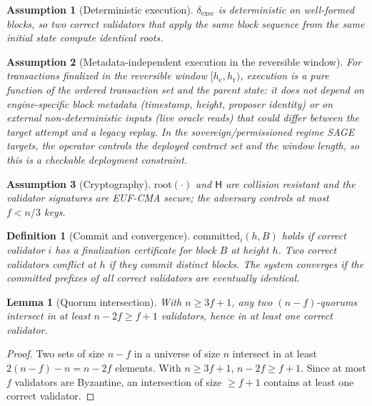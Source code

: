 \documentclass[journal]{IEEEtran}
\newtheorem{lemma}{Lemma}
\newtheorem{definition}{Definition}
\newtheorem{assumption}{Assumption}
\theoremstyle{remark}
\begin{document}
\begin{assumption}[Deterministic execution]
\label{as:exec}
$\delta_{\mathrm{exec}}$ is deterministic on well-formed blocks, so two correct validators
that apply the same block sequence from the same initial state compute identical roots.
\end{assumption}

\begin{assumption}[Metadata-independent execution in the reversible window]
\label{as:metadata}
For transactions finalized in the reversible window $[h_{\mathrm{c}}, h_{\mathrm{r}})$, execution
is a pure function of the ordered transaction set and the parent state: it does not depend on
engine-specific block metadata (timestamp, height, proposer identity) or on external
non-deterministic inputs (live oracle reads) that could differ between the target attempt and a
legacy replay. In the sovereign/permissioned regime SAGE targets, the operator controls the
deployed contract set and the window length, so this is a checkable deployment constraint.
\end{assumption}

\begin{assumption}[Cryptography]
\label{as:crypto}
$\mathrm{root}(\cdot)$ and $\mathsf{H}$ are collision resistant and the validator signatures are
EUF-CMA secure; the adversary controls at most $f<n/3$ keys.
\end{assumption}

\begin{definition}[Commit and convergence]
\label{def:commit}
$\mathrm{committed}_i(h,B)$ holds if correct validator $i$ has a finalization certificate for
block $B$ at height $h$. Two correct validators \emph{conflict} at $h$ if they commit distinct
blocks. The system \emph{converges} if the committed prefixes of all correct validators are
eventually identical.
\end{definition}

\begin{lemma}[Quorum intersection]
\label{lem:qi}
With $n\ge 3f+1$, any two $(n-f)$-quorums intersect in at least $n-2f\ge f+1$ validators, hence
in at least one correct validator.
\end{lemma}
\begin{proof}
Two sets of size $n-f$ in a universe of size $n$ intersect in at least $2(n-f)-n = n-2f$
elements. With $n\ge 3f+1$, $n-2f\ge f+1$. Since at most $f$ validators are Byzantine, an
intersection of size $\ge f+1$ contains at least one correct validator.
\end{proof}
\end{document}
